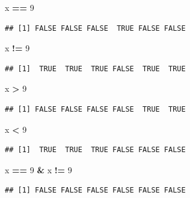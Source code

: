 \documentclass[
]{book}
\newenvironment{Shaded}{\begin{snugshade}}{\end{snugshade}}
\newcommand{\DecValTok}[1]{\textcolor[rgb]{0.00,0.00,0.81}{#1}}
\newcommand{\NormalTok}[1]{#1}
\newcommand{\OperatorTok}[1]{\textcolor[rgb]{0.81,0.36,0.00}{\textbf{#1}}}
\newcommand{\StringTok}[1]{\textcolor[rgb]{0.31,0.60,0.02}{#1}}
\theoremstyle{definition}
\theoremstyle{definition}
\theoremstyle{definition}
\theoremstyle{remark}
\begin{document}
\begin{Shaded}
\begin{Highlighting}[]
\NormalTok{x }\OperatorTok{==}\StringTok{ }\DecValTok{9}
\end{Highlighting}
\end{Shaded}

\begin{verbatim}
## [1] FALSE FALSE FALSE  TRUE FALSE FALSE
\end{verbatim}

\begin{Shaded}
\begin{Highlighting}[]
\NormalTok{x }\OperatorTok{!=}\StringTok{ }\DecValTok{9}
\end{Highlighting}
\end{Shaded}

\begin{verbatim}
## [1]  TRUE  TRUE  TRUE FALSE  TRUE  TRUE
\end{verbatim}

\begin{Shaded}
\begin{Highlighting}[]
\NormalTok{x }\OperatorTok{>}\StringTok{ }\DecValTok{9}
\end{Highlighting}
\end{Shaded}

\begin{verbatim}
## [1] FALSE FALSE FALSE FALSE  TRUE  TRUE
\end{verbatim}

\begin{Shaded}
\begin{Highlighting}[]
\NormalTok{x }\OperatorTok{<}\StringTok{ }\DecValTok{9}
\end{Highlighting}
\end{Shaded}

\begin{verbatim}
## [1]  TRUE  TRUE  TRUE FALSE FALSE FALSE
\end{verbatim}

\begin{Shaded}
\begin{Highlighting}[]
\NormalTok{x }\OperatorTok{==}\StringTok{ }\DecValTok{9} \OperatorTok{&}\StringTok{ }\NormalTok{x }\OperatorTok{!=}\StringTok{ }\DecValTok{9}
\end{Highlighting}
\end{Shaded}

\begin{verbatim}
## [1] FALSE FALSE FALSE FALSE FALSE FALSE
\end{verbatim}
\end{document}

